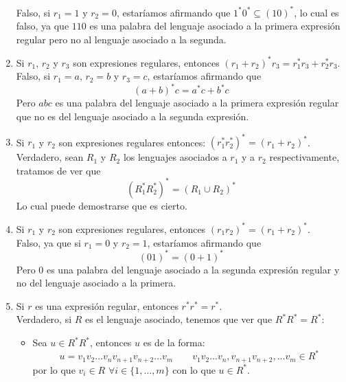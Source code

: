 \begin{enumerate}
        Falso, si $r_1 = 1$ y $r_2 = 0$, estaríamos afirmando que $1^\ast 0^\ast \subseteq {(10)}^{\ast}$, lo cual es falso, ya que $110$ es una palabra del lenguaje asociado a la primera expresión regular pero no al lenguaje asociado a la segunda.
    \item \label{item:preg7}
    Si $r_1$, $r_2$ y $r_3$ son expresiones regulares, entonces ${(r_1+r_2)}^{\ast}r_3=r_1^\ast r_3 + r_2^\ast r_3$.\\

        Falso, si $r_1 = a$, $r_2 = b$ y $r_3 = c$, estaríamos afirmando que 
        \begin{equation*}
            {(a+b)}^{\ast}c = a^\ast c + b^\ast c
        \end{equation*}
        Pero $abc$ es una palabra del lenguaje asociado a la primera expresión regular que no es del lenguaje asociado a la segunda expresión.
    \item \label{item:preg8}
     Si $r_1$ y $r_2$ son expresiones regulares entonces: ${(r_1^\ast r_2^\ast)}^{\ast}={(r_1+r_2)}^{\ast}$.\\

        Verdadero, sean $R_1$ y $R_2$ los lenguajes asociados a $r_1$ y a $r_2$ respectivamente, tratamos de ver que
        \begin{equation*}
            {(R_1^\ast R_2^\ast)}^{\ast} = {(R_1\cup R_2)}^{\ast}
        \end{equation*}
        Lo cual puede demostrarse que es cierto.
    \item Si $r_1$ y $r_2$ son expresiones regulares, entonces ${(r_1r_2)}^{\ast}={(r_1+r_2)}^{\ast}$.\\

        Falso, ya que si $r_1 = 0$ y $r_2 = 1$, estaríamos afirmando que 
        \begin{equation*}
            {(01)}^{\ast} = {(0+1)}^{\ast}
        \end{equation*}
        Pero $0$ es una palabra del lenguaje asociado a la segunda expresión regular y no del lenguaje asociado a la primera.
    \item Si $r$ es una expresión regular, entonces $r^\ast r^\ast = r^\ast$.\\

        Verdadero, si $R$ es el lenguaje asociado, tenemos que ver que $R^\ast R^\ast = R^\ast$:
        \begin{itemize}
            \item Sea $u\in R^\ast R^\ast$, entonces $u$ es de la forma:
                \begin{equation*}
                    u = v_1v_2\ldots v_nv_{n+1}v_{n+2}\ldots v_m \qquad v_1v_2\ldots v_n, v_{n+1}v_{n+2},\ldots v_m \in R^\ast
                \end{equation*}
                por lo que $v_i \in R$ $\forall i \in \{1,\ldots, m\}$ con lo que $u\in R^\ast$.


\end{itemize}
\end{enumerate}
